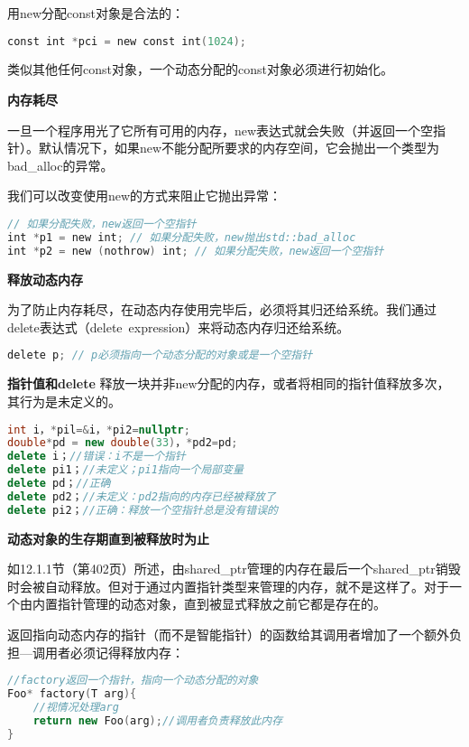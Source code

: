 \documentclass[
  a4paper,
  oneside,tablecaptionabove
]{scrbook}
\begin{document}
用new分配const对象是合法的：

\begin{lstlisting}[language={C++}]
const int *pci = new const int(1024);
\end{lstlisting}

类似其他任何const对象，一个动态分配的const对象必须进行初始化。

\textbf{内存耗尽}

一旦一个程序用光了它所有可用的内存，new表达式就会失败（并返回一个空指针）。默认情况下，如果new不能分配所要求的内存空间，它会抛出一个类型为bad\_alloc的异常。

我们可以改变使用new的方式来阻止它抛出异常：

\begin{lstlisting}[language={C++}]
// 如果分配失败，new返回一个空指针
int *p1 = new int; // 如果分配失败，new抛出std::bad_alloc
int *p2 = new (nothrow) int; // 如果分配失败，new返回一个空指针
\end{lstlisting}

\textbf{释放动态内存}

为了防止内存耗尽，在动态内存使用完毕后，必须将其归还给系统。我们通过delete表达式（delete~expression）来将动态内存归还给系统。

\begin{lstlisting}[language={C++}]
delete p; // p必须指向一个动态分配的对象或是一个空指针
\end{lstlisting}

\textbf{指针值和delete}
释放一块并非new分配的内存，或者将相同的指针值释放多次，其行为是未定义的。

\begin{lstlisting}[language={C++}]
int i，*pil=&i，*pi2=nullptr;
double*pd = new double(33)，*pd2=pd;
delete i；//错误：i不是一个指针
delete pi1；//未定义；pi1指向一个局部变量
delete pd；//正确
delete pd2；//未定义：pd2指向的内存已经被释放了
delete pi2；//正确：释放一个空指针总是没有错误的
\end{lstlisting}

\textbf{动态对象的生存期直到被释放时为止}

如12.1.1节（第402页）所述，由shared\_ptr管理的内存在最后一个shared\_ptr销毁时会被自动释放。但对于通过内置指针类型来管理的内存，就不是这样了。对于一个由内置指针管理的动态对象，直到被显式释放之前它都是存在的。

返回指向动态内存的指针（而不是智能指针）的函数给其调用者增加了一个额外负担---调用者必须记得释放内存：

\begin{lstlisting}[language={C++}]
//factory返回一个指针，指向一个动态分配的对象
Foo* factory(T arg){
    //视情况处理arg
    return new Foo(arg);//调用者负责释放此内存
}
\end{lstlisting}
\end{document}

